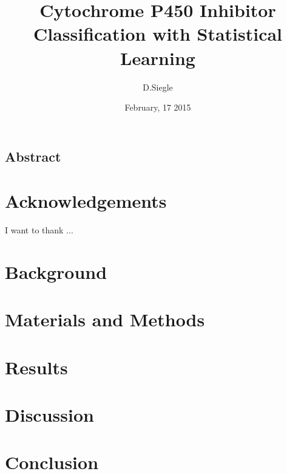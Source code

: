 \documentclass[12pt]{report}
\author{D.Siegle}
\title{Cytochrome P450 Inhibitor Classification with Statistical Learning}
\date{February, 17 2015}
\begin{document}
\maketitle

\begin{doublespacing}
\chapter*{Abstract}

\end{doublespacing}

\tableofcontents
{}
\listoffigures
{}
\listoftables

\begin{doublespacing}
\chapter*{Acknowledgements}
I want to thank ...


\chapter{Background}


\chapter{Materials and Methods}


\chapter{Results}




\chapter{Discussion}


\chapter{Conclusion}


\end{doublespacing}

{}

\end{document}
